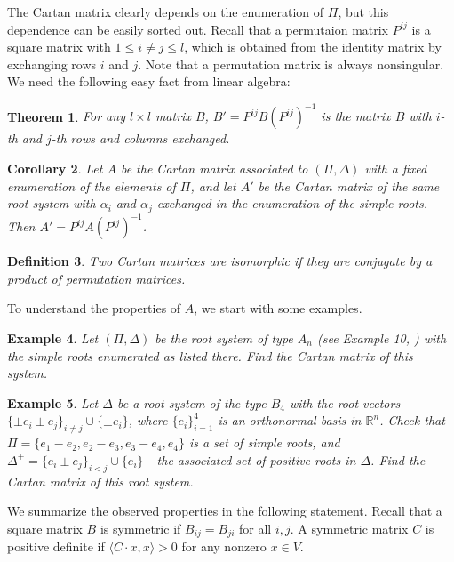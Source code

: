 \documentclass[11pt]{amsart}
\newcommand{\R}{\mathbb R}
\newtheorem{theorem}{Theorem}
\newtheorem{definition}[theorem]{Definition}
\newtheorem{corollary}[theorem]{Corollary}
\newtheorem{example}[theorem]{Example}
\begin{document}
The Cartan matrix clearly depends on the enumeration of $\Pi$, but this 
dependence can be easily sorted out. Recall that a permutaion matrix $P^{ij}$ 
is a square matrix with $1 \leq i \neq j \leq l$, which is obtained from 
the identity matrix by exchanging rows $i$ and $j$. Note that a permutation 
matrix is always nonsingular. 
We need the following easy fact from linear algebra:

\begin{theorem} For any $l\times l$ matrix $B$, $B' = P^{ij} B (P^{ij})^{-1}$ 
is the matrix $B$ with $i$-th and $j$-th rows and columns exchanged. 
\end{theorem}  

\begin{corollary} Let $A$ be the Cartan matrix associated to $(\Pi, \Delta)$ 
with a fixed enumeration of the elements of $\Pi$, and let $A'$ be the 
Cartan matrix of the same root system with $\alpha_i$ and $\alpha_j$ 
exchanged in the enumeration of the simple roots. Then 
$A' = P^{ij} A (P^{ij})^{-1}$. 
\end{corollary}

\begin{definition} Two Cartan matrices are \emph{isomorphic} if they are 
conjugate by a product of permutation matrices. 
\end{definition} 

To understand the properties of $A$, we start with some examples. 

\begin{example} Let $(\Pi, \Delta)$ be the root system of type $A_n$ 
(see Example 10, \cite{2})
with the simple roots enumerated as listed there. Find the Cartan matrix 
of this system. 
\end{example} 

\begin{example} Let $\Delta$ be a root system of the type $B_4$ 
with the root vectors $\{ \pm e_i \pm e_j\}_{i \neq j} \cup \{ \pm e_i \}$, 
where $\{e_i\}_{i=1}^4$ is an orthonormal basis in $\R^n$. Check that 
  $\Pi = \{ e_1 - e_2, e_2 - e_3, e_3 -e_4, e_4 \}$ is 
a set of simple roots, and $\Delta^+ = \{ e_i \pm e_j\}_{i<j}\cup \{e_i\}$ 
- the associated set of positive roots in $\Delta$. 
Find the Cartan matrix of this root system.    
\end{example} 

We summarize the observed properties in the following statement. 
Recall that a square 
matrix $B$ is symmetric if $B_{ij}=B_{ji}$ for all $i,j$. A symmetric 
matrix $C$ is positive definite if $\langle C \cdot x, x \rangle >0$ for 
any nonzero $x \in V$. 
\end{document}
